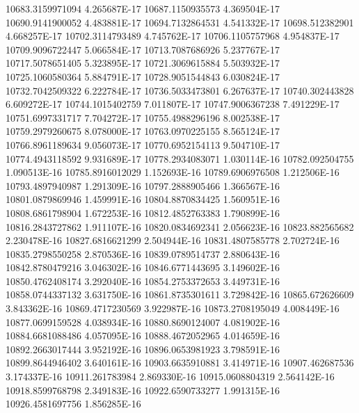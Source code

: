 10683.3159971094  4.265687E-17
10687.1150935573  4.369504E-17
10690.9141900052  4.483881E-17
10694.7132864531  4.541332E-17
10698.512382901  4.668257E-17
10702.3114793489  4.745762E-17
10706.1105757968  4.954837E-17
10709.9096722447  5.066584E-17
10713.7087686926  5.237767E-17
10717.5078651405  5.323895E-17
10721.3069615884  5.503932E-17
10725.1060580364  5.884791E-17
10728.9051544843  6.030824E-17
10732.7042509322  6.222784E-17
10736.5033473801  6.267637E-17
10740.302443828  6.609272E-17
10744.1015402759  7.011807E-17
10747.9006367238  7.491229E-17
10751.6997331717  7.704272E-17
10755.4988296196  8.002538E-17
10759.2979260675  8.078000E-17
10763.0970225155  8.565124E-17
10766.8961189634  9.056073E-17
10770.6952154113  9.504710E-17
10774.4943118592  9.931689E-17
10778.2934083071  1.030114E-16
10782.092504755  1.090513E-16
10785.8916012029  1.152693E-16
10789.6906976508  1.212506E-16
10793.4897940987  1.291309E-16
10797.2888905466  1.366567E-16
10801.0879869946  1.459991E-16
10804.8870834425  1.560951E-16
10808.6861798904  1.672253E-16
10812.4852763383  1.790899E-16
10816.2843727862  1.911107E-16
10820.0834692341  2.056623E-16
10823.882565682  2.230478E-16
10827.6816621299  2.504944E-16
10831.4807585778  2.702724E-16
10835.2798550258  2.870536E-16
10839.0789514737  2.880643E-16
10842.8780479216  3.046302E-16
10846.6771443695  3.149602E-16
10850.4762408174  3.292040E-16
10854.2753372653  3.449731E-16
10858.0744337132  3.631750E-16
10861.8735301611  3.729842E-16
10865.672626609  3.843362E-16
10869.4717230569  3.922987E-16
10873.2708195049  4.008449E-16
10877.0699159528  4.038934E-16
10880.8690124007  4.081902E-16
10884.6681088486  4.057095E-16
10888.4672052965  4.014659E-16
10892.2663017444  3.952192E-16
10896.0653981923  3.798591E-16
10899.8644946402  3.640161E-16
10903.6635910881  3.414971E-16
10907.462687536  3.174337E-16
10911.261783984  2.869330E-16
10915.0608804319  2.564142E-16
10918.8599768798  2.349183E-16
10922.6590733277  1.991315E-16
10926.4581697756  1.856285E-16
